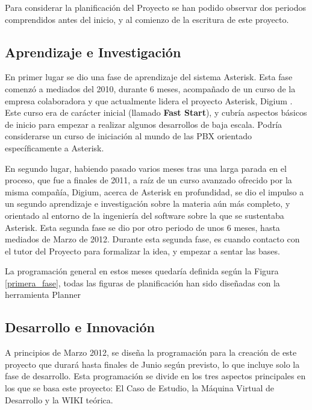 Para considerar la planificación del Proyecto se han podido observar dos periodos comprendidos antes del inicio, y al comienzo de la escritura de este proyecto.

\subsection{Aprendizaje e Investigación}

En primer lugar se dio una fase de aprendizaje del sistema Asterisk. Esta fase comenzó a mediados del 2010, durante 6 meses, acompañado de un curso de la empresa colaboradora y que actualmente lidera el proyecto Asterisk, Digium \cite{website:digium}. Este curso era de carácter inicial (llamado \textbf{Fast Start}), y cubría aspectos básicos de inicio para empezar a realizar algunos desarrollos de baja escala. Podría considerarse un curso de iniciación al mundo de las PBX orientado específicamente a Asterisk. 

En segundo lugar, habiendo pasado varios meses tras una larga parada en el proceso, que fue a finales de 2011, a raíz de un curso avanzado ofrecido por la misma compañía, Digium, acerca de Asterisk en profundidad, se dio el impulso a un segundo aprendizaje e investigación sobre la materia aún más completo, y orientado al entorno de la ingeniería del software sobre la que se sustentaba Asterisk. Esta segunda fase se dio por otro periodo de unos 6 meses, hasta mediados de Marzo de 2012. Durante esta segunda fase, es cuando contacto con el tutor del Proyecto para formalizar la idea, y empezar a sentar las bases.

La programación general en estos meses quedaría definida según la Figura \ref{primera_fase}, todas las figuras de planificación han sido diseñadas con la herramienta Planner \cite{website:planner}


\subsection{Desarrollo e Innovación}

A principios de Marzo 2012, se diseña la programación para la creación de este proyecto que durará hasta finales de Junio según previsto, lo que incluye solo la fase de desarrollo. Esta programación se divide en los tres aspectos principales en los que se basa este proyecto: El Caso de Estudio, la Máquina Virtual de Desarrollo y la WIKI teórica.

